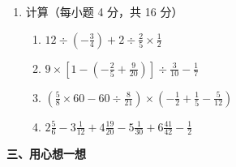 \documentclass[11pt,a4paper]{ctexart}
\begin{document}
\begin{enumerate}
    \item[11.] 计算（每小题 4 分，共 16 分）
    \begin{enumerate}
        \item[(1)] $12 \div \left(-\frac{3}{4}\right) + 2 \div \frac{2}{5} \times \frac{1}{2}$
        \vspace{3.5cm}
        
        \item[(2)] $9 \times \left[ 1 - \left(-\frac{2}{5} + \frac{9}{20}\right) \right] \div \frac{3}{10} - \frac{1}{7}$
        \vspace{3.5cm}
        
        \item[(3)] $\left(\frac{5}{8} \times 60 - 60 \div \frac{8}{21}\right) \times \left(-\frac{1}{2} + \frac{1}{5} - \frac{5}{12}\right)$
        \vspace{3.5cm}
        
        \item[(4)] $2\frac{5}{6} - 3\frac{1}{12} + 4\frac{19}{20} - 5\frac{1}{30} + 6\frac{41}{42} - \frac{1}{2}$
        \vspace{3.5cm}
    \end{enumerate}
\end{enumerate}

\vspace{0.8cm}

\noindent \textbf{三、用心想一想}
\end{document}
